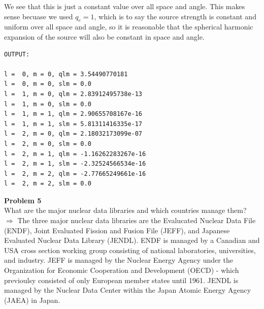\documentclass[10pt]{article}
\begin{document}
We see that this is just a constant value over all space and angle. This makes sense becuase we used $q_e = 1$, which is to say the source strength is constant and uniform over all space and angle, so it is reasonable that the spherical harmonic expansion of the source will also be constant in space and angle.\\




\begin{lstlisting}[numbers=none]
OUTPUT:

l =  0, m = 0, qlm = 3.54490770181
l =  0, m = 0, slm = 0.0
l =  1, m = 0, qlm = 2.83912495738e-13
l =  1, m = 0, slm = 0.0
l =  1, m = 1, qlm = 2.90655708167e-16
l =  1, m = 1, slm = 5.81311416335e-17
l =  2, m = 0, qlm = 2.18032173099e-07
l =  2, m = 0, slm = 0.0
l =  2, m = 1, qlm = -1.16262283267e-16
l =  2, m = 1, slm = -2.32524566534e-16
l =  2, m = 2, qlm = -2.77665249661e-16
l =  2, m = 2, slm = 0.0
\end{lstlisting}






\newpage
\noindent \textbf{Problem 5}\\
What are the major nuclear data libraries and which countries manage them?\\[5pt]

$\Rightarrow$ The three major nuclear data libraries are the Evalucated Nuclear Data File (ENDF), Joint Evaluated Fission and Fusion File (JEFF), and Japanese Evaluated Nuclear Data Library (JENDL). ENDF is managed by a Canadian and USA cross section working group consisting of national laboratories, universities, and industry. JEFF is managed by the Nuclear Energy Agency under the Organization for Economic Cooperation and Development (OECD) - which previoulsy consisted of only European member states until 1961. JENDL is managed by the Nuclear Data Center within the Japan Atomic Energy Agency (JAEA) in Japan.
\end{document}

